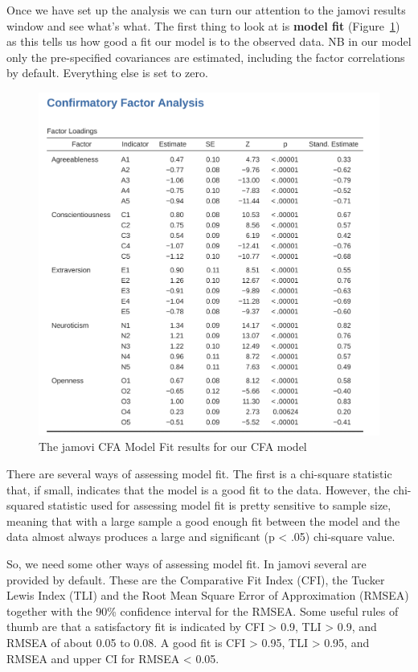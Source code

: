 \documentclass[
  a4paper,
]{book}
\begin{document}
Once we have set up the analysis we can turn our attention to the jamovi
results window and see what's what. The first thing to look at is
\textbf{model fit} (Figure~\ref{fig-fig15-15}) as this tells us how good
a fit our model is to the observed data. NB in our model only the
pre-specified covariances are estimated, including the factor
correlations by default. Everything else is set to zero.

\begin{figure}

\includegraphics[width=1\textwidth,height=\textheight]{images/fig15-15.png} \hfill{}

\caption{\label{fig-fig15-15}The jamovi CFA Model Fit results for our
CFA model}

\end{figure}

There are several ways of assessing model fit. The first is a chi-square
statistic that, if small, indicates that the model is a good fit to the
data. However, the chi-squared statistic used for assessing model fit is
pretty sensitive to sample size, meaning that with a large sample a good
enough fit between the model and the data almost always produces a large
and significant (p \textless{} .05) chi-square value.

So, we need some other ways of assessing model fit. In jamovi several
are provided by default. These are the Comparative Fit Index (CFI), the
Tucker Lewis Index (TLI) and the Root Mean Square Error of Approximation
(RMSEA) together with the 90\% confidence interval for the RMSEA. Some
useful rules of thumb are that a satisfactory fit is indicated by CFI
\textgreater{} 0.9, TLI \textgreater{} 0.9, and RMSEA of about 0.05 to
0.08. A good fit is CFI \textgreater{} 0.95, TLI \textgreater{} 0.95,
and RMSEA and upper CI for RMSEA \textless{} 0.05.
\end{document}
